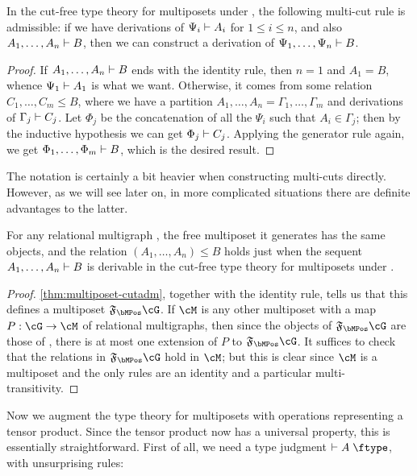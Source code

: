 \begin{thm}\label{thm:multiposet-multicutadm}
  In the cut-free type theory for multiposets under \cG, the following multi-cut rule is admissible: if we have derivations of $\Psi_i\vdash A_i$ for $1\le i\le n$, and also $A_1,\dots,A_n \vdash B$, then we can construct a derivation of $\Psi_1,\dots,\Psi_n\vdash B$.
\end{thm}
\begin{proof}
  If $A_1,\dots,A_n \vdash B$ ends with the identity rule, then $n=1$ and $A_1=B$, whence $\Psi_1\vdash A_1$ is what we want.
  Otherwise, it comes from some relation $C_1,\dots,C_m \le B$, where we have a partition $A_1,\dots,A_n = \Gamma_1,\dots,\Gamma_m$ and derivations of $\Gamma_j \vdash C_j$.
  Let $\Phi_j$ be the concatenation of all the $\Psi_i$ such that $A_i \in \Gamma_j$; then by the inductive hypothesis we can get $\Phi_j\vdash C_j$.
  Applying the generator rule again, we get $\Phi_1,\dots,\Phi_m \vdash B$, which is the desired result.
\end{proof}

The notation is certainly a bit heavier when constructing multi-cuts directly.
However, as we will see later on, in more complicated situations there are definite advantages to the latter.

\begin{thm}\label{thm:multiposet-initial}
  For any relational multigraph \cG, the free multiposet it generates has the same objects, and the relation $(A_1,\dots,A_n)\le B$ holds just when the sequent $A_1,\dots,A_n\vdash B$ is derivable in the cut-free type theory for multiposets under \cG.
\end{thm}
\begin{proof}
  \cref{thm:multiposet-cutadm}, together with the identity rule, tells us that this defines a multiposet $\F\bMPos\cG$.
  If $\cM$ is any other multiposet with a map $P:\cG\to\cM$ of relational multigraphs, then since the objects of $\F\bMPos\cG$ are those of \cG, there is at most one extension of $P$ to $\F\bMPos\cG$.
  It suffices to check that the relations in $\F\bMPos\cG$ hold in $\cM$; but this is clear since $\cM$ is a multiposet and the only rules are an identity and a particular multi-transitivity.
\end{proof}

Now we augment the type theory for multiposets with operations representing a tensor product.
Since the tensor product now has a universal property, this is essentially straightforward.
First of all, we need a type judgment $\types A\type$, with unsurprising rules:

